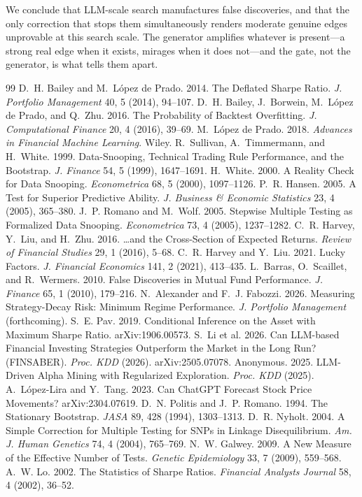 \documentclass[sigconf,review,anonymous]{acmart}
\begin{document}
We conclude that LLM-scale search manufactures false discoveries, and that the only correction that stops them simultaneously renders moderate genuine edges unprovable at this search scale. The generator amplifies whatever is present---a strong real edge when it exists, mirages when it does not---and the gate, not the generator, is what tells them apart.


\begin{thebibliography}{99}
\small
{} D.~H. Bailey and M.~L\'opez de Prado. 2014. The Deflated Sharpe Ratio. \emph{J. Portfolio Management} 40, 5 (2014), 94--107.
 D.~H. Bailey, J.~Borwein, M.~L\'opez de Prado, and Q.~Zhu. 2016. The Probability of Backtest Overfitting. \emph{J. Computational Finance} 20, 4 (2016), 39--69.
 M.~L\'opez de Prado. 2018. \emph{Advances in Financial Machine Learning}. Wiley.
 R.~Sullivan, A.~Timmermann, and H.~White. 1999. Data-Snooping, Technical Trading Rule Performance, and the Bootstrap. \emph{J. Finance} 54, 5 (1999), 1647--1691.
 H.~White. 2000. A Reality Check for Data Snooping. \emph{Econometrica} 68, 5 (2000), 1097--1126.
 P.~R. Hansen. 2005. A Test for Superior Predictive Ability. \emph{J. Business \& Economic Statistics} 23, 4 (2005), 365--380.
 J.~P. Romano and M.~Wolf. 2005. Stepwise Multiple Testing as Formalized Data Snooping. \emph{Econometrica} 73, 4 (2005), 1237--1282.
 C.~R. Harvey, Y.~Liu, and H.~Zhu. 2016. \ldots and the Cross-Section of Expected Returns. \emph{Review of Financial Studies} 29, 1 (2016), 5--68.
 C.~R. Harvey and Y.~Liu. 2021. Lucky Factors. \emph{J. Financial Economics} 141, 2 (2021), 413--435.
 L.~Barras, O.~Scaillet, and R.~Wermers. 2010. False Discoveries in Mutual Fund Performance. \emph{J. Finance} 65, 1 (2010), 179--216.
 N.~Alexander and F.~J. Fabozzi. 2026. Measuring Strategy-Decay Risk: Minimum Regime Performance. \emph{J. Portfolio Management} (forthcoming).
 S.~E. Pav. 2019. Conditional Inference on the Asset with Maximum Sharpe Ratio. arXiv:1906.00573.
 S.~Li et al. 2026. Can LLM-based Financial Investing Strategies Outperform the Market in the Long Run? (FINSABER). \emph{Proc. KDD} (2026). arXiv:2505.07078.
 Anonymous. 2025. LLM-Driven Alpha Mining with Regularized Exploration. \emph{Proc. KDD} (2025).
 A.~L\'opez-Lira and Y.~Tang. 2023. Can ChatGPT Forecast Stock Price Movements? arXiv:2304.07619.
 D.~N. Politis and J.~P. Romano. 1994. The Stationary Bootstrap. \emph{JASA} 89, 428 (1994), 1303--1313.
 D.~R. Nyholt. 2004. A Simple Correction for Multiple Testing for SNPs in Linkage Disequilibrium. \emph{Am. J. Human Genetics} 74, 4 (2004), 765--769.
 N.~W. Galwey. 2009. A New Measure of the Effective Number of Tests. \emph{Genetic Epidemiology} 33, 7 (2009), 559--568.
 A.~W. Lo. 2002. The Statistics of Sharpe Ratios. \emph{Financial Analysts Journal} 58, 4 (2002), 36--52.
\end{thebibliography}
\end{document}
